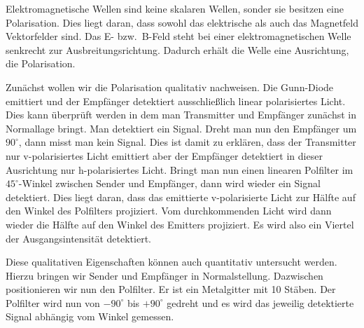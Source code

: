 \documentclass[a4paper,10pt,twocolumn]{article}
\begin{document}
%
    
    Elektromagnetische Wellen sind keine skalaren Wellen, sonder sie besitzen eine Polarisation.
    Dies liegt daran, dass sowohl das elektrische als auch das Magnetfeld Vektorfelder sind.
    Das E- bzw.\ B-Feld steht bei einer elektromagnetischen Welle senkrecht zur Ausbreitungsrichtung.
    Dadurch erhält die Welle eine Ausrichtung, die Polarisation.
    
    Zunächst wollen wir die Polarisation qualitativ nachweisen.
    Die Gunn-Diode emittiert und der Empfänger detektiert ausschließlich linear polarisiertes Licht.
    Dies kann überprüft werden in dem man Transmitter und Empfänger zunächst in Normallage bringt.
    Man detektiert ein Signal.
    Dreht man nun den Empfänger um $90^\circ$, dann misst man kein Signal.
    Dies ist damit zu erklären, dass der Transmitter nur v-polarisiertes Licht emittiert aber der Empfänger detektiert in
    dieser Ausrichtung nur h-polarisiertes Licht.
    Bringt man nun einen linearen Polfilter im $45^\circ$-Winkel zwischen Sender und Empfänger, dann wird
    wieder ein Signal detektiert.
    Dies liegt daran, dass das emittierte v-polarisierte Licht zur Hälfte auf den Winkel des Polfilters
    projiziert. 
    Vom durchkommenden Licht wird dann wieder die Hälfte auf den Winkel des Emitters projiziert.
    Es wird also ein Viertel der Ausgangsintensität detektiert.
    
    Diese qualitativen Eigenschaften können auch quantitativ untersucht werden.
    Hierzu bringen wir Sender und Empfänger in Normalstellung.
    Dazwischen positionieren wir nun den Polfilter.
    Er ist ein Metalgitter mit 10 Stäben.
    Der Polfilter wird nun von $-90^\circ$ bis $+90^\circ$ gedreht und es wird das jeweilig detektierte Signal
    abhängig vom Winkel gemessen.
    
\end{document}
